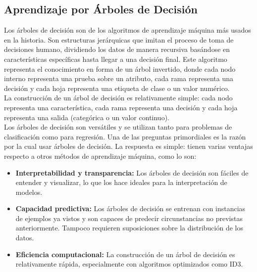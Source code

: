 \documentclass[12pt]{article}
\begin{document}
\cite{De0a100enIA}

\subsection{Aprendizaje por Árboles de Decisión}
Los árboles de decisión son de los algoritmos de aprendizaje máquina más usados en la historia. Son estructuras jerárquicas que imitan el proceso de toma de decisiones humano, dividiendo los datos de manera recursiva basándose en características específicas hasta llegar a una decisión final. Este algoritmo representa el conocimiento en forma de un árbol invertido, donde cada nodo interno representa una prueba sobre un atributo, cada rama representa una decisión y cada hoja representa una etiqueta de clase o un valor numérico.
\\
La construcción de un árbol de decisión es relativamente simple: cada nodo representa una característica, cada rama representa una decisión y cada hoja representa una salida (categórica o un valor continuo).
\\
Los árboles de decisión son versátiles y se utilizan tanto para problemas de clasificación como para regresión. Una de las preguntas primordiales es la razón por la cual usar árboles de decisión. La respuesta es simple: tienen varias ventajas respecto a otros métodos de aprendizaje máquina, como lo son:
\begin{itemize}
    \item \textbf{Interpretabilidad y transparencia:} Los árboles de decisión son fáciles de entender y visualizar, lo que los hace ideales para la interpretación de modelos.
    \item \textbf{Capacidad predictiva:} Los árboles de decisión se entrenan con instancias de ejemplos ya vistos y son capaces de predecir circunstancias no previstas anteriormente. Tampoco requieren suposiciones sobre la distribución de los datos.
    \item \textbf{Eficiencia computacional:} La construcción de un árbol de decisión es relativamente rápida, especialmente con algoritmos optimizados como ID3.
\end{itemize}
\end{document}
